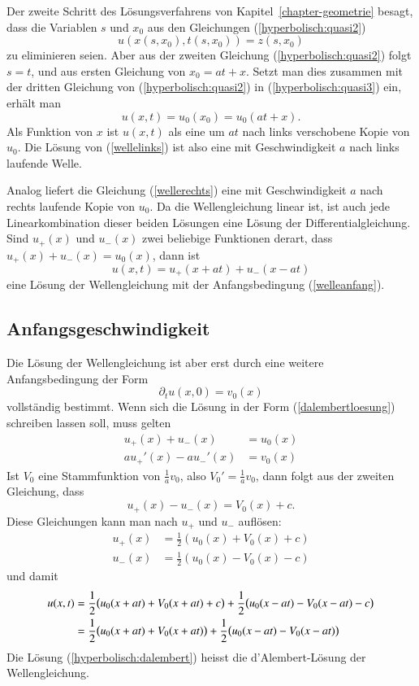 Der zweite Schritt des Lösungsverfahrens von Kapitel~\ref{chapter-geometrie}
besagt, dass die Variablen $s$ und $x_0$ aus den Gleichungen
(\ref{hyperbolisch:quasi2})
\begin{equation}
u(x(s,x_0), t(s,x_0))=z(s,x_0)
\label{hyperbolisch:quasi3}
\end{equation}
zu eliminieren seien.
Aber aus der zweiten Gleichung 
(\ref{hyperbolisch:quasi2})
folgt $s=t$, und aus
ersten Gleichung von
$x_0=at+x$. Setzt man dies zusammen mit der dritten Gleichung von
(\ref{hyperbolisch:quasi2}) in 
(\ref{hyperbolisch:quasi3}) ein, erhält man
\[
u(x, t)=u_0(x_0)=u_0(at+x).
\]
Als Funktion von $x$ ist
$u(x,t)$ als eine um $at$ nach links verschobene Kopie von $u_0$.
Die Lösung von (\ref{wellelinks})
ist also eine mit Geschwindigkeit $a$ nach links
laufende Welle.

Analog liefert die Gleichung (\ref{wellerechts}) eine mit Geschwindigkeit
$a$ nach rechts laufende Kopie von $u_0$. Da die Wellengleichung linear ist,
ist auch jede Linearkombination dieser beiden Lösungen eine Lösung der
Differentialgleichung. Sind $u_+(x)$ und $u_-(x)$ zwei beliebige Funktionen
derart, dass $u_+(x)+u_-(x)=u_0(x)$, dann ist
\begin{equation}
u(x,t)=u_+(x+at)+u_-(x-at)
\label{dalembertloesung}
\end{equation}
eine Lösung der Wellengleichung mit der Anfangsbedingung (\ref{welleanfang}).

\subsection{Anfangsgeschwindigkeit}
Die Lösung der Wellengleichung ist aber erst durch eine weitere
Anfangsbedingung der Form
\begin{equation}
\partial_tu(x,0)=v_0(x)\label{welleanfangdt}
\end{equation}
vollständig bestimmt.
Wenn sich die Lösung in der Form (\ref{dalembertloesung}) schreiben lassen
soll, muss gelten
\begin{align*}
u_+(x)+u_-(x)&=u_0(x)\\
au_+'(x)-au_-'(x)&=v_0(x)
\end{align*}
Ist $V_0$ eine Stammfunktion von $\frac1av_0$, also $V_0'=\frac1av_0$,
dann folgt aus der zweiten Gleichung, dass 
\[
u_+(x)-u_-(x)=V_0(x)+c.
\]
Diese Gleichungen kann man nach $u_+$ und $u_-$ auflösen:
\begin{align*}
u_+(x)&=\frac12(u_0(x)+V_0(x)+c)\\
u_-(x)&=\frac12(u_0(x)-V_0(x)-c)
\end{align*}
und damit
\begin{align}
u(x,t)
&=
\frac12\bigl(u_0(x+at)+V_0(x+at)+c\bigr)+\frac12\bigl(u_0(x-at)-V_0(x-at)-c\bigr)
\notag
\\
&=
\frac12\bigl(u_0(x+at)+V_0(x+at)\bigr)+\frac12\bigl(u_0(x-at)-V_0(x-at)\bigr)
\label{hyperbolisch:dalembert}
\end{align}
Die Lösung (\ref{hyperbolisch:dalembert})
heisst die d'Alembert-Lösung der Wellengleichung.

